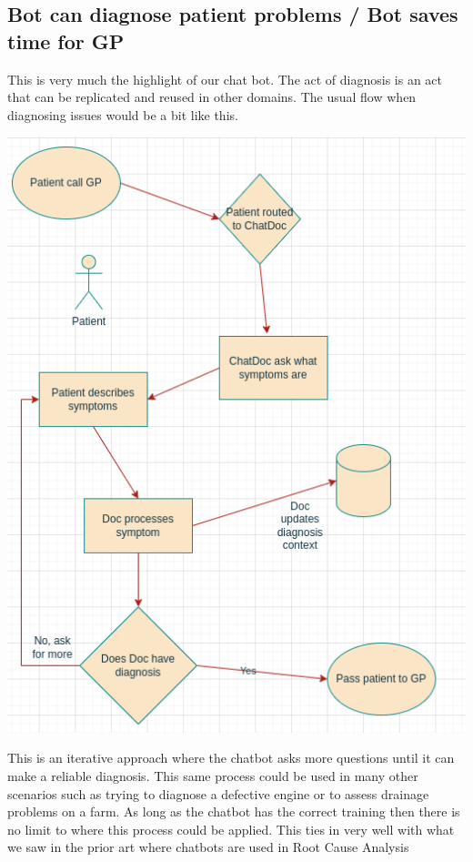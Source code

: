 \documentclass{article}
\begin{document}
\subsection{Bot can diagnose patient problems / Bot saves time for GP}

This is very much the highlight of our chat bot. The act of diagnosis is an act that can be replicated and reused in other domains. 
The usual flow when diagnosing issues would be a bit like this.
\begin{center} 
\includegraphics[scale=0.5]{PatientFlow}
\end{center}
This is an iterative approach where the chatbot asks more questions until it can make a reliable diagnosis. This same process could be used in many other scenarios such as trying to diagnose a defective engine or to assess drainage problems on a farm. As long as the chatbot has the correct training then there is no limit to where this process could be applied. This ties in very well with what we saw in the prior art where chatbots are used in Root Cause Analysis\cite{gyan}\cite{devops}
\end{document}
